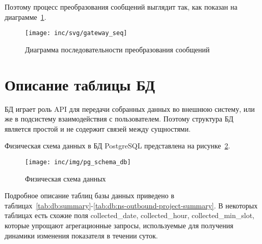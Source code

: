 Поэтому процесс преобразования сообщений выглядит так, как показан на диаграмме~\ref{pic:gateway:seq}.

\begin{figure}[!ht]
    \centering
    \texttt{[image: inc/svg/gateway\_seq]}
    \caption{Диаграмма последовательности преобразования сообщений}
    \label{pic:gateway:seq}
\end{figure}


\section{Описание таблицы БД} %

БД играет роль API для передачи собранных данных во внешнюю систему,
или же в подсистему взаимодействия с пользователем.
Поэтому структура БД является простой и не содержит связей между сущностями.

Физическая схема данных в БД PostgreSQL представлена на рисунке~\ref{pic:schema-db}. %

\begin{figure}[!ht]
    \centering
    \texttt{[image: inc/img/pg\_schema\_db]}
    \caption{Физическая схема данных}
    \label{pic:schema-db}
\end{figure}

Подробное описание таблиц базы данных приведено в таблицах~\ref{tab:db:summary}-\ref{tab:db:ns-outbound-project-summary}.
В некоторых таблицах есть схожие поля collected\_date, collected\_hour, collected\_min\_slot,
которые упрощают агрегационные запросы, используемые для получения динамики изменения показателя в течении суток.

